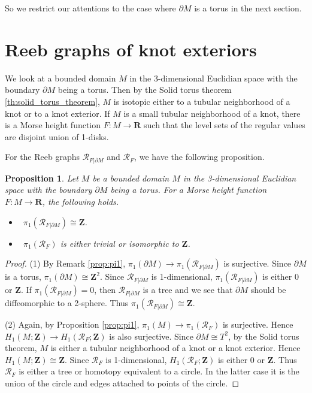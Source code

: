 \documentclass{amsart}
\newtheorem{proposition}[theorem]{Proposition}
\numberwithin{equation}{section}
\newcommand{\RR}{{\boldsymbol{R}}}
\newcommand{\ZZ}{{\boldsymbol{Z}}}
\newcommand{\lra}{\longrightarrow}
\newcommand{\bd}{\partial}
\begin{document}
So we restrict our attentions to the case where $\bd M$ is a torus in the next section. 



\section{Reeb graphs of knot exteriors}

We look at a bounded domain $M$ in the 3-dimensional Euclidian space with the boundary $\bd M$ being a torus.
Then by the Solid torus theorem \ref{th:solid_torus_theorem}, $M$ is isotopic either to a tubular neighborhood of a knot or to a knot exterior.
If $M$ is a small tubular neighborhood of a knot, there is a Morse height function $F:M\lra \RR$ such that the level sets of the regular values are disjoint union of 1-disks.

For the Reeb graphs $\mathcal{R}_{F|\bd M}$ and $\mathcal{R}_{F}$, we have the following proposition.

\begin{proposition}\label{prop:pi1_torus}
Let $M$ be a bounded domain $M$ in the 3-dimensional Euclidian space with the boundary $\bd M$ being a torus. For a Morse height function $F:M\lra \RR$, the following holds.
\begin{itemize}
\item[\rm(1)]\ 
$\pi_1( \mathcal{R}_{F|\bd M})\cong \ZZ$.
\item[\rm(2)]\ 
$\pi_1( \mathcal{R}_{F})$ is either trivial or isomorphic to $\ZZ$.
\end{itemize} 
\end{proposition}

\begin{proof}
(1) By Remark \ref{prop:pi1},  $\pi_1(\bd M)\lra \pi_1(\mathcal{R}_{F|\bd M})$ is surjective. Since $\bd M$ is a torus, $\pi_1(\bd M)\cong \ZZ^2$. Since $\mathcal{R}_{F|\bd M}$ is 1-dimensional, $\pi_1( \mathcal{R}_{F|\bd M})$ is either $0$ or $\ZZ$. 
If $\pi_1( \mathcal{R}_{F|\bd M})=0$, then $\mathcal{R}_{F|\bd M}$ is a tree and we see that $\bd M$ should be diffeomorphic to a 2-sphere. Thus $\pi_1( \mathcal{R}_{F|\bd M})\cong \ZZ$.

(2) Again, by Proposition \ref{prop:pi1},  $\pi_1(M)\lra \pi_1(\mathcal{R}_F)$ is surjective. Hence 
 $H_1(M;\ZZ)\lra H_1(\mathcal{R}_F;\ZZ)$ is also surjective. Since $\bd M\cong T^2$, by the Solid torus theorem, $M$ is either a tubular neighborhood of a knot or a knot exterior. Hence $H_1(M;\ZZ)\cong \ZZ$. Since $\mathcal{R}_F$ is 1-dimensional, $H_1(\mathcal{R}_F;\ZZ)$ is either $0$ or $\ZZ$.
Thus $\mathcal{R}_F$ is either a tree or homotopy equivalent to a circle. In the latter case it is the union of the circle and edges attached to points of the circle.
\end{proof}
\end{document}
